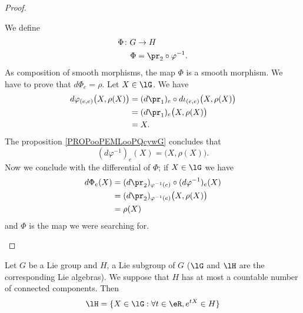 \begin{proof}
\begin{subproof}
        We define
        \begin{equation}
            \begin{aligned}
                \Phi\colon G&\to H \\
                \Phi&=\pr_2\circ \varphi^{-1}.
            \end{aligned}
        \end{equation}
        As composition of smooth morphisms, the map \( \Phi\) is a smooth morphism. We have to prove that \( d\Phi_e=\rho\).
        Let \( X\in\lG\). We have
        \begin{subequations}
            \begin{align}
                d\varphi_{(e,e)}\big( X,\rho(X) \big)&=(d\pr_1)_e\circ d\iota_{(e,e)}\big( X,\rho(X) \big)\\
                &=(d\pr_1)_e\big( X,\rho(X) \big)\\
                &=X.
            \end{align}
        \end{subequations}
        The proposition \ref{PROPooPEMLooPQcywG} concludes that 
        \begin{equation}
            (d\varphi^{-1})_e(X)=\big( X,\rho(X) \big).
        \end{equation}
    \spitem[Conclusion]
        Now we conclude with the differential of \( \Phi\); if \( X\in\lG\) we have
        \begin{subequations}
            \begin{align}
                d\Phi_e(X)&=(d\pr_2)_{\varphi^{-1}(e)}\circ (d\varphi^{-1})_e(X)\\
                &=(d\pr_2)_{\varphi^{-1}(e)}\big( X,\rho(X) \big)\\
                &=\rho(X)
            \end{align}
        \end{subequations}
        and \( \Phi\) is the map we were searching for.
    \end{subproof}
\end{proof}


\begin{proposition}     \label{PROPooCRKMooIIbKUM}
Let $G$ be a Lie group and $H$, a Lie subgroup of $G$ ($\lG$ and $\lH$ are the corresponding Lie algebras). We suppose that $H$ has at most a countable number of connected components. Then
\begin{equation}
  \lH=\{ X\in\lG:\forall t\in\eR,e^{tX}\in H \}
\end{equation}
\end{proposition}

